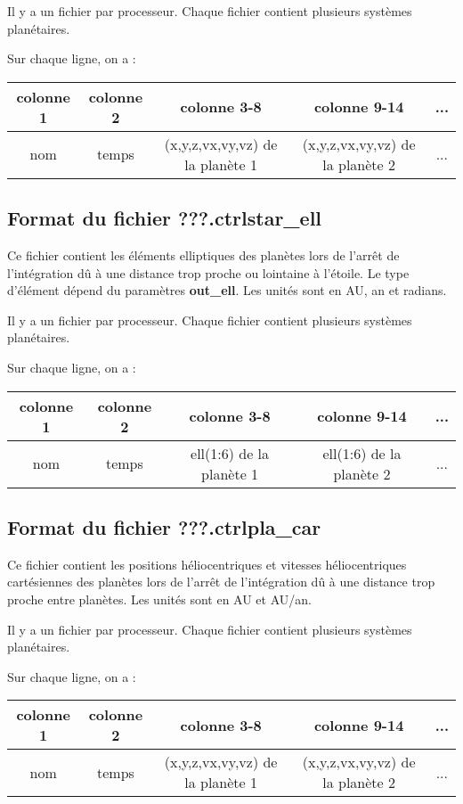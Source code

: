 \documentclass[11pt]{article}
\begin{document}
 Il y a un fichier par processeur. Chaque fichier contient plusieurs syst\`emes plan\'etaires.


Sur chaque ligne, on a : 

\begin{tabular}{|c|c|c|c|c|} \hline
colonne 1 &   colonne 2 & colonne 3-8 & colonne 9-14 & ... \\ \hline
nom & temps & (x,y,z,vx,vy,vz) de la plan\`ete 1  & (x,y,z,vx,vy,vz) de la plan\`ete 2 & ... \\    \hline
\end{tabular}

\subsection{Format du fichier {\bf ???.ctrlstar\_ell}}

Ce fichier contient les \'el\'ements elliptiques des plan\`etes lors de l'arr\^et de l'int\'egration d\^u \`a une distance trop proche ou lointaine \`a l'\'etoile. Le type d'\'el\'ement d\'epend du param\`etres  {\bf out\_ell}. Les unit\'es sont en AU, an et radians.

 Il y a un fichier par processeur. Chaque fichier contient plusieurs syst\`emes plan\'etaires.

Sur chaque ligne, on a : 

\begin{tabular}{|c|c|c|c|c|} \hline
colonne 1 &   colonne 2 & colonne 3-8 & colonne 9-14 & ... \\ \hline
nom & temps & ell(1:6) de la plan\`ete 1  & ell(1:6) de la plan\`ete 2 & ... \\    \hline
\end{tabular}

\subsection{Format du fichier  {\bf ???.ctrlpla\_car}}

Ce fichier contient les positions h\'eliocentriques et vitesses h\'eliocentriques cart\'esiennes des plan\`etes lors de l'arr\^et de l'int\'egration d\^u \`a une distance trop proche entre plan\`etes. Les unit\'es sont en AU et AU/an.

 Il y a un fichier par processeur. Chaque fichier contient plusieurs syst\`emes plan\'etaires.


Sur chaque ligne, on a : 

\begin{tabular}{|c|c|c|c|c|} \hline
colonne 1 &   colonne 2 & colonne 3-8 & colonne 9-14 & ... \\ \hline
nom & temps & (x,y,z,vx,vy,vz) de la plan\`ete 1  & (x,y,z,vx,vy,vz) de la plan\`ete 2 & ... \\    \hline
\end{tabular}
\end{document}

